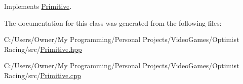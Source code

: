 Implements \hyperlink{class_primitive_aef765029fae092f0f6dd1507e18e72e0}{Primitive}.



The documentation for this class was generated from the following files\-:\begin{DoxyCompactItemize}
\item 
C\-:/\-Users/\-Owner/\-My Programming/\-Personal Projects/\-Video\-Games/\-Optimist Racing/src/\hyperlink{_primitive_8hpp}{Primitive.\-hpp}\item 
C\-:/\-Users/\-Owner/\-My Programming/\-Personal Projects/\-Video\-Games/\-Optimist Racing/src/\hyperlink{_primitive_8cpp}{Primitive.\-cpp}\end{DoxyCompactItemize}
